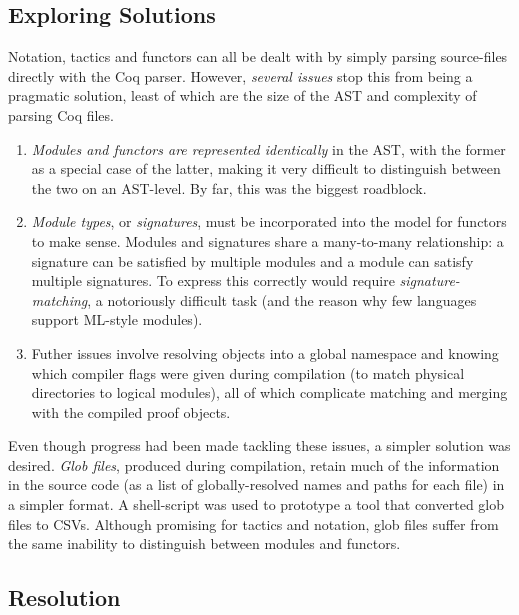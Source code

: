 \subsection{Exploring Solutions}

Notation, tactics and functors can all be dealt with by simply parsing
source-files directly with the Coq parser. However, \emph{several issues}
stop this from being a pragmatic solution, least of which are the size of the
AST and complexity of parsing Coq files.

\begin{enumerate}

  \item \emph{Modules and functors are represented identically} in the AST, with
    the former as a special case of the latter, making it very difficult to
    distinguish between the two on an AST-level. By far, this was the biggest
    roadblock.

  \item \emph{Module types}, or \emph{signatures}, must be incorporated into
    the model for functors to make sense. Modules and signatures share a
    many-to-many relationship: a signature can be satisfied by multiple modules
    and a module can satisfy multiple signatures. To express this correctly
    would require \emph{signature-matching}, a notoriously difficult task (and
    the reason why few languages support ML-style modules).

  \item Futher issues involve resolving objects into a global namespace and
    knowing which compiler flags were given during compilation (to match
    physical directories to logical modules), all of which complicate matching
    and merging with the compiled proof objects.

\end{enumerate}

Even though progress had been made tackling these issues, a simpler solution was
desired. \emph{Glob files}, produced during compilation, retain much of the
information in the source code (as a list of globally-resolved names and paths
for each file) in a simpler format. A shell-script was used to prototype a tool
that converted glob files to CSVs. Although promising for tactics and notation,
glob files suffer from the same inability to distinguish between modules and
functors.

\subsection{Resolution}

